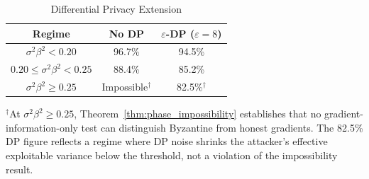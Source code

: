 \begin{table}[htbp]
\centering
\footnotesize
\caption{Differential Privacy Extension}
\label{tab:dp_extension}
\setlength{\tabcolsep}{3pt}
\begin{tabular}{|c|c|c|}
\hline
\textbf{Regime} & \textbf{No DP} & \textbf{$\varepsilon$-DP ($\varepsilon=8$)} \\
\hline
$\sigma^2\beta^2 < 0.20$ & 96.7\% & 94.5\% \\
$0.20 \leq \sigma^2\beta^2 < 0.25$ & 88.4\% & 85.2\% \\
$\sigma^2\beta^2 \geq 0.25$ & Impossible$^{\dagger}$ & 82.5\%$^{\dagger}$ \\
\hline
\end{tabular}
\end{table}

${}^{\dagger}$At $\sigma^2\beta^2 \geq 0.25$, Theorem~\ref{thm:phase_impossibility} establishes that no gradient-information-only test can distinguish Byzantine from honest gradients. The 82.5\% DP figure reflects a regime where DP noise shrinks the attacker's effective exploitable variance below the threshold, not a violation of the impossibility result.
